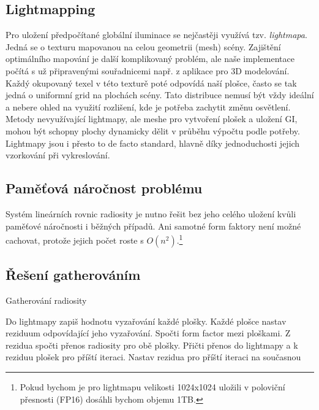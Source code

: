 \documentclass[czech]{pyt-report}
\begin{document}
\subsection{Lightmapping}
\label{sec:radiosita-lightmapping}

Pro uložení předpočítané globální iluminace se nejčastěji využívá tzv. \textit{lightmapa}. Jedná se o texturu mapovanou na celou geometrii (mesh) scény. Zajištění optimálního mapování je další komplikovaný problém, ale naše implementace počítá s už připravenými souřadnicemi např. z aplikace pro 3D modelování. Každý okupovaný texel v této texturě poté odpovídá naší plošce, často se tak jedná o uniformní grid na plochách scény. Tato distribuce nemusí být vždy ideální a nebere ohled na využití rozlišení, kde je potřeba zachytit změnu osvětlení. Metody nevyužívající lightmapy, ale meshe pro vytvoření plošek a uložení GI, mohou být schopny plochy dynamicky dělit v průběhu výpočtu podle potřeby. Lightmapy jsou i přesto to de facto standard, hlavně díky jednoduchosti jejich vzorkování při vykreslování.

\subsection{Paměťová náročnost problému}
\label{sec:radiosita-pamet}

Systém lineárních rovnic radiosity je nutno řešit bez jeho celého uložení kvůli paměťové náročnosti i běžných případů. Ani samotné form faktory není možné cachovat, protože jejich počet roste s $O(n^2)$.\footnote{Pokud bychom je pro lightmapu velikosti 1024x1024 uložili v poloviční přesnosti (FP16) dosáhli bychom objemu 1TB.}

\subsection{Řešení gatherováním}
\label{sec:radiosita-gather}

\begin{algorithm}[H]
\caption{Gatherování radiosity~\cite{Cohen1993}}\label{alg:fabrik}
\begin{algorithmic}[1]
\State Do lightmapy zapiš hodnotu vyzařování každé plošky.
\State Každé plošce nastav reziduum odpovídající jeho vyzařování.
        \State Spočti form factor mezi ploškami.
        \State Z rezidua spočti přenos radiosity pro obě plošky.
        \State Přičti přenos do lightmapy a k reziduu plošek pro příští iteraci.
    \EndFor
    \State Nastav rezidua pro příští iteraci na současnou
\EndFor
\end{algorithmic}
\end{algorithm}
\end{document}
